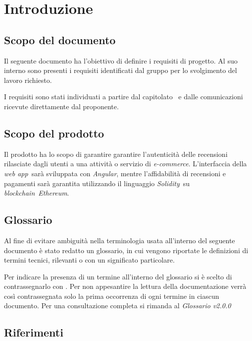\section{Introduzione}


\subsection{Scopo del documento}
Il seguente documento ha l'obiettivo di definire i requisiti di progetto. Al suo interno sono presenti i requisiti
identificati dal gruppo \groupName\: per lo svolgimento del lavoro richiesto.

I requisiti sono stati individuati a partire dal capitolato \capName\ e dalle comunicazioni ricevute direttamente dal proponente.

\subsection{Scopo del prodotto}
Il prodotto ha lo scopo di garantire garantire l'autenticità
delle recensioni rilasciate dagli utenti a una attività o servizio di \textit{e-commerce}\glo. L'interfaccia della \textit{web app}\glo\ sarà sviluppata con \textit{Angular}\glo, mentre l'affidabilità di recensioni e pagamenti sarà garantita utilizzando il linguaggio \textit{Solidity}\glo\ su \textit{blockchain}\glo\ \textit{Ethereum}\glo.


\subsection{Glossario}
Al fine di evitare ambiguità nella terminologia usata all'interno del seguente
documento è stato redatto un glossario, in cui vengono riportate le definizioni
di termini tecnici, rilevanti o con un significato particolare.

Per indicare
la presenza di un termine all'interno del glossario si è scelto di
contrassegnarlo con \glo . Per non appesantire la lettura della documentazione
verrà così contrassegnata solo la prima occorrenza di ogni termine in ciascun
documento.
Per una consultazione completa si rimanda al \textit{Glossario v2.0.0}

\subsection{Riferimenti}
